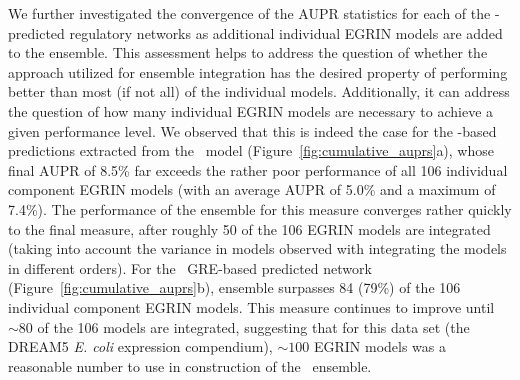 We further investigated the convergence of the AUPR statistics for each of the \egrine-predicted regulatory networks as additional individual EGRIN models are added to the ensemble. This assessment helps to address the question of whether the approach utilized for ensemble integration has the desired property of performing better than most (if not all) of the individual models. Additionally, it can address the question of how many individual EGRIN models are necessary to achieve a given performance level. We observed that this is indeed the case for the \nwinf-based predictions extracted from the \egrine\ model (Figure~\ref{fig:cumulative_auprs}a), whose final AUPR of 8.5\% far exceeds the rather poor performance of all 106 individual component EGRIN models (with an average AUPR of 5.0\% and a maximum of 7.4\%). The performance of the ensemble for this measure converges rather quickly to the final measure, after roughly 50 of the 106 EGRIN models are integrated (taking into account the variance in models observed with integrating the models in different orders).  For the \egrine\ GRE-based predicted network (Figure~\ref{fig:cumulative_auprs}b), ensemble surpasses 84 (79\%) of the 106 individual component EGRIN models. This measure continues to improve until $\sim 80$ of the 106 models are integrated, suggesting that for this data set (the DREAM5 {\it E. coli} expression compendium), $\sim 100$ EGRIN models was a reasonable number to use in construction of the \egrine\ ensemble.

